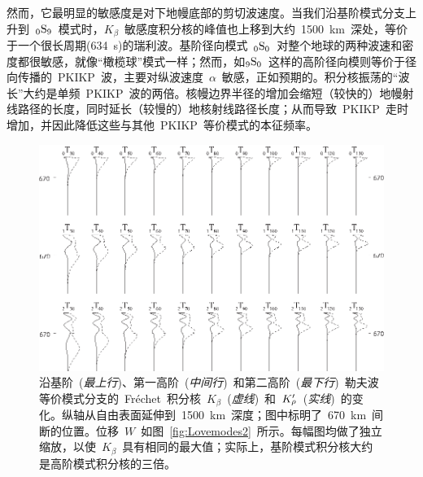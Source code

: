 然而，它最明显的敏感度是对下地幔底部的剪切波速度。当我们沿基阶模式分支上升到~${}_0{\rm S}_9$~模式时，$K_{\beta}$~敏感度积分核的峰值也上移到大约~1500~km~深处，等价于一个很长周期(634~s)的瑞利波。基阶径向模式~${}_0{\rm S}_0$~对整个地球的两种波速和密度都很敏感，就像“橄榄球”模式一样；然而，如${}_9{\rm S}_0$~这样的高阶径向模则等价于径向传播的~PKIKP~波，主要对纵波速度~$\alpha$~敏感，正如预期的。积分核振荡的“波长”大约是单频~PKIKP~波的两倍。核幔边界半径的增加会缩短（较快的）地幔射线路径的长度，同时延长（较慢的）地核射线路径长度；从而导致~PKIKP~走时增加，并因此降低这些与其他~PKIKP~等价模式的本征频率。
\begin{figure}[!t]
\begin{center}
\includegraphics{../figures/chap09/fig08.eps}
\end{center}
\caption[Lovemodekernels]{\label{9.fig.Love}
沿基阶~({\em 最上行\/})、第一高阶~({\em 中间行\/})~和第二高阶~({\em 最下行\/})~勒夫波等价模式分支的~Fr\'{e}chet~积分核~$K_{\beta}$~({\em 虚线\/})~和~$K_{\raisebox{0.3 ex}{\scriptsize$\rho$}}^{\prime}$~({\em 实线\/})~的变化。纵轴从自由表面延伸到~1500~km~深度；图中标明了~670~km~间断的位置。位移~$W$~如图~\ref{fig:Lovemodes2}~所示。每幅图均做了独立缩放，以使~$K_{\beta}$~具有相同的最大值；实际上，基阶模式积分核大约是高阶模式积分核的三倍。
}
\end{figure}

